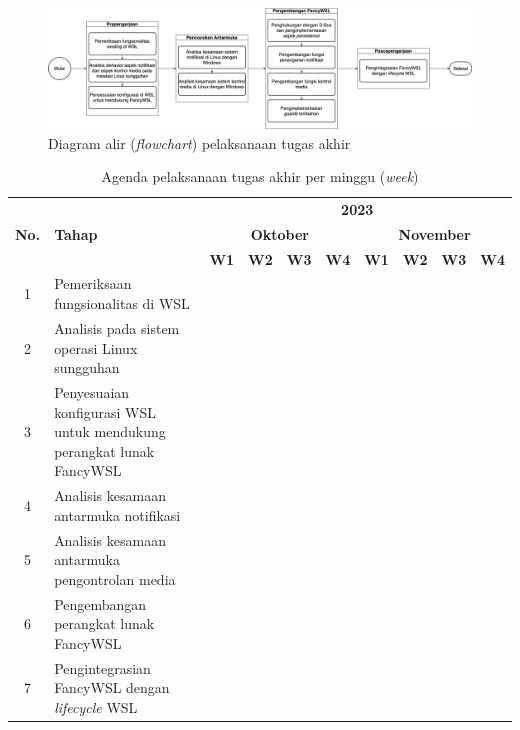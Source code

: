 \begin{figure}
    \centering
    \includegraphics[width=1\linewidth]{assets/alur-pengerjaan-v1.png}
    \caption{Diagram alir (\textit{flowchart}) pelaksanaan tugas akhir}
    \label{diagram-alir-pelaksanaan}
\end{figure}

\begin{table}
    \centering
    \caption{Agenda pelaksanaan tugas akhir per minggu (\textit{week})}
    \begin{tabular}{|c|p{4cm}|c|c|c|c|c|c|c|c|} \hline 
        \multirow{3}{*}{\textbf{No.}} & \multirow{3}{*}{\textbf{Tahap}} & \multicolumn{8}{c|}{\textbf{2023}}\\ \cline{3-10} 
        & & \multicolumn{4}{c|}{\textbf{Oktober}} & \multicolumn{4}{c|}{\textbf{November}}\\ \cline{3-10} 
        & & \textbf{W1} & \textbf{W2} & \textbf{W3} & \textbf{W4} & \textbf{W1} & \textbf{W2} & \textbf{W3} & \textbf{W4}\\ \hline 
        1 & Pemeriksaan fungsionalitas di WSL & \cellcolor{black} &  &  &  &  &  &  & \\ \hline 
        2 & Analisis pada sistem operasi Linux sungguhan & \cellcolor{black} & \cellcolor{black} &  &  &  &  &  & \\ \hline 
        3 & Penyesuaian konfigurasi WSL untuk mendukung perangkat lunak FancyWSL &  &  & \cellcolor{black} & \cellcolor{black} &  &  &  & \\ \hline 
        4 & Analisis kesamaan antarmuka notifikasi &  &  & \cellcolor{black} & \cellcolor{black} & \cellcolor{black} & &  & \\ \hline 
        5 & Analisis kesamaan antarmuka pengontrolan media &  &  & \cellcolor{black} & \cellcolor{black} & \cellcolor{black} &  &  & \\ \hline 
        6 & Pengembangan perangkat lunak FancyWSL &  &  &  &  & \cellcolor{black} & \cellcolor{black} & \cellcolor{black} & \cellcolor{black}\\ \hline 
        7 & Pengintegrasian FancyWSL dengan \textit{lifecycle} WSL &  &  &  &  &  &  &  & \cellcolor{black}\\ \hline 
    \end{tabular}
    \label{tabel-agenda-pelaksanaan}
\end{table}

